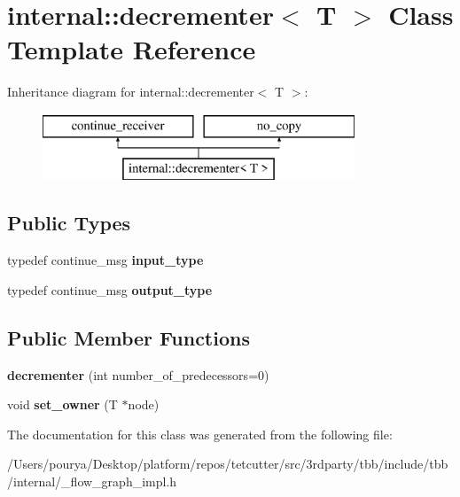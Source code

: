 \hypertarget{classinternal_1_1decrementer}{}\section{internal\+:\+:decrementer$<$ T $>$ Class Template Reference}
\label{classinternal_1_1decrementer}
Inheritance diagram for internal\+:\+:decrementer$<$ T $>$\+:\begin{figure}[H]
\begin{center}
\leavevmode
\includegraphics[height=2.000000cm]{classinternal_1_1decrementer}
\end{center}
\end{figure}
\subsection*{Public Types}
\begin{DoxyCompactItemize}
\item 
\hypertarget{classinternal_1_1decrementer_a4d3a6fd32a1ffdc7695734ef78858958}{}typedef continue\+\_\+msg {\bfseries input\+\_\+type}\label{classinternal_1_1decrementer_a4d3a6fd32a1ffdc7695734ef78858958}

\item 
\hypertarget{classinternal_1_1decrementer_ac87f70e17b7a8f3bfd2642c6a3bbee74}{}typedef continue\+\_\+msg {\bfseries output\+\_\+type}\label{classinternal_1_1decrementer_ac87f70e17b7a8f3bfd2642c6a3bbee74}

\end{DoxyCompactItemize}
\subsection*{Public Member Functions}
\begin{DoxyCompactItemize}
\item 
\hypertarget{classinternal_1_1decrementer_af48a4160e423d60b75d895ba1a91f542}{}{\bfseries decrementer} (int number\+\_\+of\+\_\+predecessors=0)\label{classinternal_1_1decrementer_af48a4160e423d60b75d895ba1a91f542}

\item 
\hypertarget{classinternal_1_1decrementer_af99f598d4be3b527cd4823e6309f6fbd}{}void {\bfseries set\+\_\+owner} (T $\ast$node)\label{classinternal_1_1decrementer_af99f598d4be3b527cd4823e6309f6fbd}

\end{DoxyCompactItemize}


The documentation for this class was generated from the following file\+:\begin{DoxyCompactItemize}
\item 
/\+Users/pourya/\+Desktop/platform/repos/tetcutter/src/3rdparty/tbb/include/tbb/internal/\+\_\+flow\+\_\+graph\+\_\+impl.\+h\end{DoxyCompactItemize}
